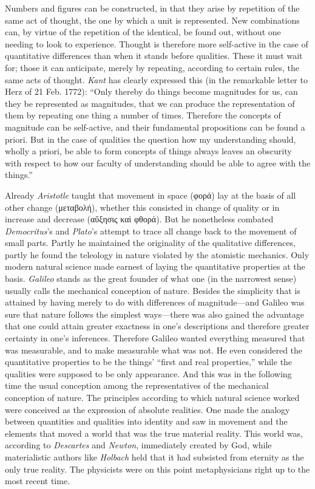 \documentclass[12pt,a4paper]{book}
\newcommand{\opage}[1]{\marginnote{\footnotesize\textit{[#1]}}}
\begin{document}
Numbers and figures can be constructed, in that they arise by repetition of
the same act of thought, the one by which a unit is represented. New
combinations can, by virtue of the repetition of the identical, be found out,
without one needing to look to experience. Thought is therefore more
self-active in the case of quantitative differences than when it stands
before qualities. These it must wait for; those it can anticipate, merely by
repeating, according to certain rules, the same acts of thought. \emph{Kant}
has clearly \opage{276}expressed this (in the remarkable letter to Herz of 21 Feb.
1772): ``Only thereby do things become magnitudes for us, can they be
represented as magnitudes, that we can produce the representation of them by
repeating one thing a number of times. Therefore the concepts of magnitude
can be self-active, and their fundamental propositions can be found a priori.
But in the case of qualities the question how my understanding should, wholly
a priori, be able to form concepts of things always leaves an obscurity with
respect to how our faculty of understanding should be able to agree with the
things.''

Already \emph{Aristotle} taught that movement in space (φορά) lay at the basis
of all other change (μεταβολή), whether this consisted in change of quality or
in increase and decrease (αὔξησις καὶ φθορά). But he nonetheless combated
\emph{Democritus}'s and \emph{Plato}'s attempt to trace all change back to the
movement of small parts. Partly he maintained the originality of the
qualitative differences, partly he found the teleology in nature violated by
the atomistic mechanics. Only modern natural science made earnest of laying
the quantitative properties at the basis. \emph{Galileo} stands as the great
founder of what one (in the narrowest sense) usually calls the mechanical
conception of nature. Besides the simplicity that is attained by having merely
to do with differences of magnitude---and Galileo was sure that nature
follows the simplest ways---there was also gained the advantage that one could
attain greater exactness in one's descriptions and therefore greater certainty
in one's inferences. Therefore Galileo wanted everything measured that was
measurable, and to make measurable what was not. He even considered the
quantitative properties to be the things' ``first and real properties,''
while the qualities were supposed to be only appearance. And this was in the
following time the usual conception among the representatives of the
mechanical conception of nature. The principles according to which natural
science worked were conceived as the expression of absolute realities. One
made the analogy between quantities and qualities into identity and saw in
movement and the elements that moved a world that was \opage{277}the true material
reality. This world was, according to \emph{Descartes} and \emph{Newton},
immediately created by God, while materialistic authors like \emph{Holbach}
held that it had subsisted from eternity as the only true reality. The
physicists were on this point metaphysicians right up to the most recent time.
\end{document}
